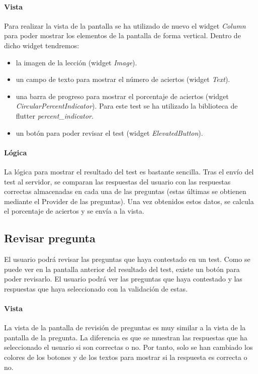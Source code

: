 \paragraph*{Vista}
\label{sec:vista}

Para realizar la vista de la pantalla se ha utilizado de nuevo el widget \textit{Column} para poder mostrar los elementos de la pantalla de forma vertical. 
Dentro de dicho widget tendremos:
\begin{itemize}
  \item la imagen de la lección (widget \textit{Image}).
  \item un campo de texto para mostrar el número de aciertos (widget \textit{Text}).
  \item una barra de progreso para mostrar el porcentaje de aciertos (widget \textit{CircularPercentIndicator}). 
  Para este test se ha utilizado la biblioteca de flutter \textit{percent\_indicator}.
  \item un botón para poder revisar el test (widget \textit{ElevatedButton}).
\end{itemize}

\paragraph*{Lógica}
\label{sec:logica}
La lógica para mostrar el resultado del test es bastante sencilla.
Tras el envío del test al servidor, se comparan las respuestas del usuario con las respuestas correctas almacenadas en cada una de las preguntas 
(estas últimas se obtienen mediante el Provider de las preguntas). 
Una vez obtenidos estos datos, se calcula el porcentaje de aciertos y se envía a la vista.



\subsection{Revisar pregunta}
\label{sec:pregunta}
El usuario podrá revisar las preguntas que haya contestado en un test. Como se puede ver en la pantalla anterior del resultado del test, 
existe un botón para poder revisarlo. El usuario podrá ver las preguntas que haya contestado y las respuestas que haya seleccionado con la validación de estas.

\paragraph*{Vista}
\label{sec:vista}
La vista de la pantalla de revisión de preguntas es muy similar a la vista de la pantalla de la pregunta. 
La diferencia es que se muestran las respuestas que ha seleccionado el usuario si son correctas o no.
Por tanto, solo se han cambiado los colores de los botones y de los textos para mostrar si la respuesta es correcta o no.

